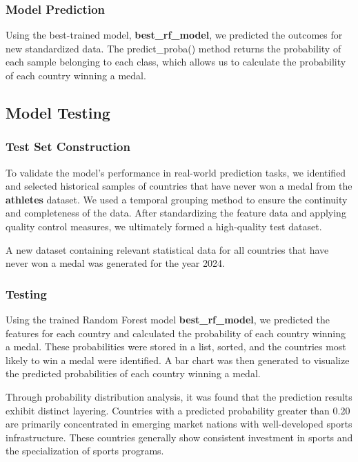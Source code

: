 \documentclass{mcmthesis}
\begin{document}
\subsubsection{Model Prediction}
    Using the best-trained model, {\bf best\_rf\_model}, we predicted the outcomes for new standardized data. The predict\_proba() method returns the probability of each sample belonging to each class, which allows us to calculate the probability of each country winning a medal.

\subsection{Model Testing}

\subsubsection{Test Set Construction}

    To validate the model's performance in real-world prediction tasks, we identified and selected historical samples of countries that have never won a medal from the {\bf athletes} dataset. We used a temporal grouping method to ensure the continuity and completeness of the data. After standardizing the feature data and applying quality control measures, we ultimately formed a high-quality test dataset.

    A new dataset containing relevant statistical data for all countries that have never won a medal was generated for the year 2024.

\subsubsection{Testing}

    Using the trained Random Forest model {\bf best\_rf\_model}, we predicted the features for each country and calculated the probability of each country winning a medal. These probabilities were stored in a list, sorted, and the countries most likely to win a medal were identified. A bar chart was then generated to visualize the predicted probabilities of each country winning a medal.

    Through probability distribution analysis, it was found that the prediction results exhibit distinct layering. Countries with a predicted probability greater than 0.20 are primarily concentrated in emerging market nations with well-developed sports infrastructure. These countries generally show consistent investment in sports and the specialization of sports programs.
\end{document}

